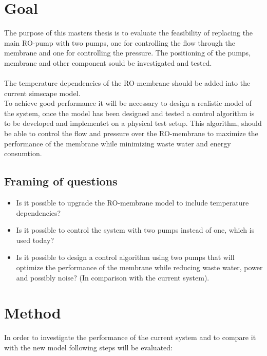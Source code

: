 \section{Goal}
The purpose of this masters thesis is to evaluate the feasibility of replacing the main RO-pump with two pumps, one for controlling the flow through the membrane and one for controlling the pressure. The positioning of the pumps, membrane and other component sould be investigated and tested. \\
\\
The temperature dependencies of the RO-membrane should be added into the current simscape model.
\\
To achieve good performance it will be necessary to design a realistic model of the system, once the model has been designed and tested a control algorithm is to be developed and implementet on a physical test setup. This algorithm, should be able to control the flow and pressure over the RO-membrane to maximize the performance of the membrane while minimizing waste water and energy consumtion. \\


\subsection{Framing of questions}
\label{framing}
\begin{itemize}
\renewcommand\labelitemi{-}
   \item Is it possible to upgrade the RO-membrane model to include temperature dependencies?
   \item Is it possible to control the system with two pumps instead of one, which is used today?
   \item Is it possible to design a control algorithm using two pumps that will optimize the performance of the membrane while reducing waste water, power and possibly noise? (In comparison with the current system).   
\end{itemize}


\section{Method}

In order to investigate the performance of the current system and to compare it with the new model following steps will be evaluated:

